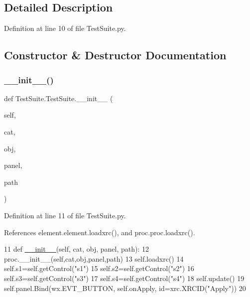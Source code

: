 \subsection{Detailed Description}


Definition at line 10 of file Test\+Suite.\+py.



\subsection{Constructor \& Destructor Documentation}
\mbox{\label{classTestSuite_1_1TestSuite_a21be2485fa1e8a4d16b7f0a90b186599}} 
\subsubsection{\texorpdfstring{\+\_\+\+\_\+init\+\_\+\+\_\+()}{\_\_init\_\_()}}
{\footnotesize\ttfamily def Test\+Suite.\+Test\+Suite.\+\_\+\+\_\+init\+\_\+\+\_\+ (\begin{DoxyParamCaption}\item[{}]{self,  }\item[{}]{cat,  }\item[{}]{obj,  }\item[{}]{panel,  }\item[{}]{path }\end{DoxyParamCaption})}



Definition at line 11 of file Test\+Suite.\+py.



References element.\+element.\+loadxrc(), and proc.\+proc.\+loadxrc().


\begin{DoxyCode}
11     \textcolor{keyword}{def }\hyperlink{classwrapper_1_1ModuleDictWrapper_a9a7a794150502f51df687831583e13b9}{\_\_init\_\_}(self, cat, obj, panel, path):
12         proc.\_\_init\_\_(self,cat,obj,panel,path)
13         self.loadxrc()
14         self.s1=self.getControl(\textcolor{stringliteral}{"s1"})
15         self.s2=self.getControl(\textcolor{stringliteral}{"s2"})
16         self.s3=self.getControl(\textcolor{stringliteral}{"s3"})
17         self.s4=self.getControl(\textcolor{stringliteral}{"s4"})
18         self.update()
19         self.panel.Bind(wx.EVT\_BUTTON, self.onApply, id=xrc.XRCID(\textcolor{stringliteral}{"Apply"}))
20 
\end{DoxyCode}


